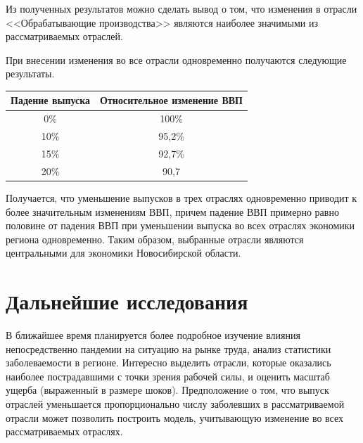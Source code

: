 \documentclass[12pt, a4paper]{article}
\begin{document}
Из полученных результатов можно сделать вывод о том, что изменения в отрасли <<Обрабатывающие производства>> являются наиболее значимыми из рассматриваемых отраслей.

При внесении изменения во все отрасли одновременно получаются следующие результаты.
\begin{center}
\begin{tabular}{|c|c|}
\hline
Падение выпуска & Относительное изменение ВВП\\
\hline
0\% & 100\%\\
10\% & 95,2\%\\
15\% & 92,7\%\\
20\% & 90,7\\
\hline
\end{tabular}
\end{center}

Получается, что уменьшение выпусков в трех отраслях одновременно приводит к более значительным изменениям ВВП, причем падение ВВП примерно равно половине от падения ВВП при уменьшении выпуска во всех отраслях экономики региона одновременно. Таким образом, выбранные отрасли являются центральными для экономики Новосибирской области.

\section{Дальнейшие исследования}
В ближайшее время планируется более подробное изучение влияния непосредственно пандемии на ситуацию на рынке труда, анализ статистики заболеваемости в регионе. Интересно выделить отрасли, которые оказались наиболее пострадавшими с точки зрения рабочей силы, и оценить масштаб ущерба (выраженный в размере шоков). Предположение о том, что выпуск отраслей уменьшается пропорционально числу заболевших в рассматриваемой отрасли может позволить построить модель, учитывающую изменение во всех рассматриваемых отраслях.
\newpage



\end{document}
